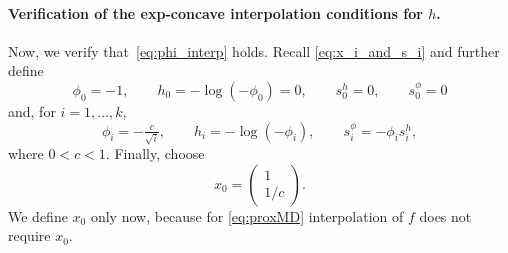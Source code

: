 \documentclass[a4paper]{article}
\begin{document}
\paragraph{Verification of the exp-concave interpolation conditions for $h$.}
Now, we verify that~\eqref{eq:phi_interp} holds.
Recall \eqref{eq:x_i_and_s_i} and further define
\[
        \phi_0=  -1,
        \qquad
        h_0= -\log(-\phi_0)=0,
        \qquad
        s_0^h= 0,
        \qquad
        s_0^\phi= 0
\]
and, for $i=1,\ldots,k$,
\[
        \phi_i= -\tfrac{c}{\sqrt i},
        \qquad
        h_i= -\log(-\phi_i),
        \qquad
        s_i^\phi= -\phi_i s_i^h,
\]
where \(0<c<1\).
Finally, choose
\[
        x_0=
        \begin{pmatrix}
        1\\
        1/c
        \end{pmatrix}.
      \]
We define $x_0$ only now, because for \eqref{eq:proxMD} interpolation of $f$ does not require $x_0$.
\end{document}
